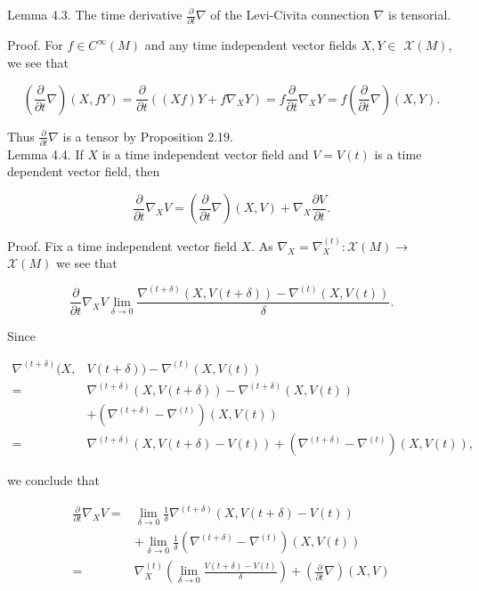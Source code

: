 \documentclass[10pt, letterpaper]{article}
\begin{document}
Lemma 4.3. The time derivative $\frac{\partial}{\partial t} \nabla$ of the Levi-Civita connection $\nabla$ is tensorial.

Proof. For $f \in C^{\infty}(M)$ and any time independent vector fields $X, Y \in$ $\mathscr{X}(M)$, we see that

$$
\left(\frac{\partial}{\partial t} \nabla\right)(X, f Y)=\frac{\partial}{\partial t}\left((X f) Y+f \nabla_{X} Y\right)=f \frac{\partial}{\partial t} \nabla_{X} Y=f\left(\frac{\partial}{\partial t} \nabla\right)(X, Y) .
$$

Thus $\frac{\partial}{\partial t} \nabla$ is a tensor by Proposition 2.19.\\
Lemma 4.4. If $X$ is a time independent vector field and $V=V(t)$ is a time dependent vector field, then

$$
\frac{\partial}{\partial t} \nabla_{X} V=\left(\frac{\partial}{\partial t} \nabla\right)(X, V)+\nabla_{X} \frac{\partial V}{\partial t} .
$$

Proof. Fix a time independent vector field $X$. As $\nabla_{X}=\nabla_{X}^{(t)}: \mathscr{X}(M) \rightarrow$ $\mathscr{X}(M)$ we see that

$$
\frac{\partial}{\partial t} \nabla_{X} V \lim _{\delta \rightarrow 0} \frac{\nabla^{(t+\delta)}(X, V(t+\delta))-\nabla^{(t)}(X, V(t))}{\delta} .
$$

Since

$$
\begin{aligned}
\nabla^{(t+\delta)}(X, & V(t+\delta))-\nabla^{(t)}(X, V(t)) \\
= & \nabla^{(t+\delta)}(X, V(t+\delta))-\nabla^{(t+\delta)}(X, V(t)) \\
& +\left(\nabla^{(t+\delta)}-\nabla^{(t)}\right)(X, V(t)) \\
= & \nabla^{(t+\delta)}(X, V(t+\delta)-V(t))+\left(\nabla^{(t+\delta)}-\nabla^{(t)}\right)(X, V(t)),
\end{aligned}
$$

we conclude that

$$
\begin{aligned}
\frac{\partial}{\partial t} \nabla_{X} V= & \lim _{\delta \rightarrow 0} \frac{1}{\delta} \nabla^{(t+\delta)}(X, V(t+\delta)-V(t)) \\
& +\lim _{\delta \rightarrow 0} \frac{1}{\delta}\left(\nabla^{(t+\delta)}-\nabla^{(t)}\right)(X, V(t)) \\
= & \nabla_{X}^{(t)}\left(\lim _{\delta \rightarrow 0} \frac{V(t+\delta)-V(t)}{\delta}\right)+\left(\frac{\partial}{\partial t} \nabla\right)(X, V)
\end{aligned}
$$
\end{document}
